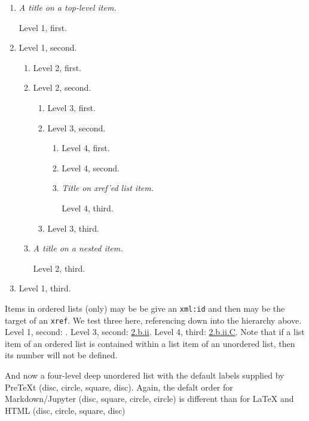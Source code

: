 \documentclass[pdflatex]{sn-jnl}
\theoremstyle{thmstyleone}%
\theoremstyle{thmstyletwo}%
\theoremstyle{thmstylethree}%
\newcommand{\xreffont}{\relax}
\newcommand{\mono}[1]{\texttt{#1}}
\newcommand{\lititle}[1]{{\slshape#1}}
\numberwithin{equation}{section}
\begin{document}
\begin{enumerate}
\item{}\lititle{A title on a top-level item.}\par%
Level 1, first.%
\item\hypertarget{list-two}{}Level 1, second.%
\begin{enumerate}
\item{}Level 2, first.%
\item{}Level 2, second.%
\begin{enumerate}
\item{}Level 3, first.%
\item\hypertarget{list-two-two-two}{}Level 3, second.%
\begin{enumerate}
\item{}Level 4, first.%
\item{}Level 4, second.%
\item\hypertarget{list-two-two-two-three}{}\lititle{Title on xref'ed list item.}\par%
Level 4, third.%
\end{enumerate}
%
\item{}Level 3, third.%
\end{enumerate}
%
\item{}\lititle{A title on a nested item.}\par%
Level 2, third.%
\end{enumerate}
%
\item{}Level 1, third.%
\end{enumerate}
%
\par
Items in ordered lists (only) may be be give an \mono{xml:id} and then may be the target of an \mono{xref}.  We test three here, referencing down into the hierarchy above.  Level 1, second: \hyperlink{list-two}{{\xreffont 2}}.  Level 3, second: \hyperlink{list-two-two-two}{{\xreffont 2.b.ii}}.  Level 4, third: \hyperlink{list-two-two-two-three}{{\xreffont 2.b.ii.C}}.  Note that if a list item of an ordered list is contained within a list item of an unordered list, then its number will not be defined.%
\par
And now a four-level deep unordered list with the default labels supplied by PreTeXt (disc, circle, square, disc).  Again, the defalt order for Markdown\slash{}Jupyter (disc, square, circle, circle) is different than for \LaTeX{} and HTML (disc, circle, square, disc)%
\end{document}
